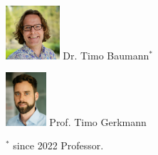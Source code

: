 \documentclass[aspectratio=169]{beamer}
\begin{document}
\begin{frame}[fragile]
\begin{minipage}{.5\textwidth}
\begin{minipage}{.3\textwidth}
            \centering
            \includegraphics[height=2cm]{images/Timo_Baumann.jpg}
            \small{Dr. Timo Baumann}$^{*}$
        \end{minipage}%
        \begin{minipage}{.3\textwidth}
            \centering
            \includegraphics[height=2cm]{images/Timo_Florian_Gerkmann.png}
            \small{Prof. Timo Gerkmann}
        \end{minipage}
    \end{minipage}
    \begin{minipage}{0.9\textwidth}
        \hfill $^{*}$ since 2022 Professor.
    \end{minipage}
\end{frame}
\end{document}
